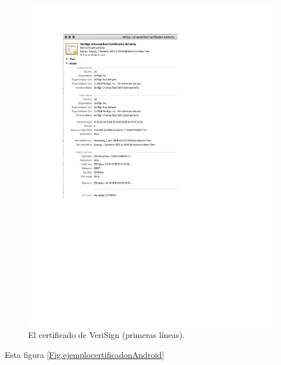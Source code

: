 \documentclass[12pt]{report} %
\begin{document}
\begin{itemize}
\begin{figure}
\centering
\includegraphics[width=0.85\columnwidth]{imagenes/certifverisignej.pdf}
\caption{El certificado de VeriSign (primeras líneas).}
\label{Fig.ejemplocertificadoVerisign}
\end{figure} 

Esta figura \ref{Fig.ejemplocertificadonAndroid}


\end{itemize}
\end{document}
